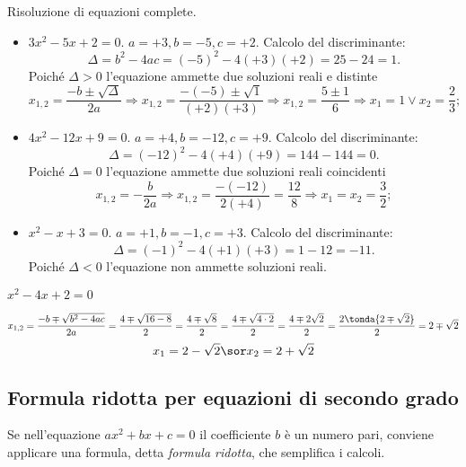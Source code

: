 \begin{esempio}
Risoluzione di equazioni complete.
\begin{itemize}
\item \(3 x^{2} - 5 x + 2=0\). \(a = + 3, b = - 5, c = + 2\). Calcolo del 
discriminante: 
\[\Delta = b^{2} - 4 ac = ( - 5 )^{2} - 4 ( + 3 ) ( + 2 ) = 25 - 24 = 1.\]
 Poiché \(\Delta > 0\) l'equazione ammette due soluzioni reali e distinte 
\[x_{1,2} = \frac{- b \pm \sqrt{\Delta}}{2 a} \Rightarrow x_{1,2} = \frac{- (- 
5) \pm \sqrt{1}}{( + 2 ) ( + 3 )} \Rightarrow x_{1,2} = \frac{5 \pm 1}{6} 
\Rightarrow x_{1} = 1 \vee x_{2} = \frac{2}{3};\]
\item \(4 x^{2} - 12 x + 9=0\). \(a = + 4, b = - 12, c = + 9\). Calcolo del 
discriminante: 
\[\Delta=( - 12 )^{2} - 4 ( + 4 ) ( + 9 )=144 - 144 =0.\] 
Poiché \(\Delta = 0\) l'equazione ammette due soluzioni reali coincidenti 
\[x_{1,2} = - \frac{b}{2 a} \Rightarrow x_{1,2} = \frac{- ( - 12)}{2 ( + 4 )} = 
\frac{12}{8} \Rightarrow x_{1} = x_{2} = \frac{3}{2};\]
\item \(x^{2} - x + 3=0\). \(a = + 1, b = - 1, c = + 3\). Calcolo del 
discriminante: 
\[\Delta = ( - 1 )^{2} - 4 ( + 1 ) ( + 3 ) = 1 - 12 = - 11.\] Poiché \(\Delta < 
0\) l'equazione non ammette soluzioni reali.
\end{itemize}
\end{esempio}
\begin{esempio}
\(x^{2} - 4 x + 2=0\)

\[x_{1,2} = \frac{- b \mp \sqrt{b^2-4ac}}{2a} = 
\frac{4 \mp \sqrt{16-8}}{2} = \frac{4 \mp \sqrt{8}}{2} = 
\frac{4 \mp \sqrt{4 \cdot 2}}{2} = \frac{4 \mp 2 \sqrt{2}}{2} = 
\frac{2 \tonda{2 \mp \sqrt{2}}}{2} = 2 \mp \sqrt{2}\]
\[x_{1} = 2 - \sqrt{2} \sor x_{2} = 2 + \sqrt{2}\]
\end{esempio}


\subsection{Formula ridotta per equazioni di secondo grado}
Se nell'equazione
\(a x^{2} + b x + c=0\) il coefficiente \(b\) è un numero pari, conviene 
applicare una formula, detta \emph{formula ridotta}, che semplifica i 
calcoli.


